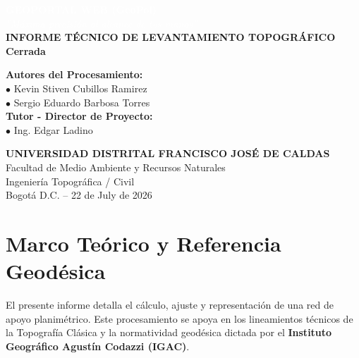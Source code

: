 \documentclass[11pt,letterpaper]{article}
\begin{document}
\begin{titlepage}
\vspace*{-2cm}
\begin{center}
  \textcolor{white}{\Huge \textbf{GEOPORTAL WEB (GeoPol)}} \\[0.5cm]
  \textcolor{white}{\large \textit{''Máxima precisión al alcance de tus manos''}} \\[2cm]
  \vspace{3cm}
  {\LARGE \textbf{INFORME TÉCNICO DE LEVANTAMIENTO TOPOGRÁFICO}} \\[0.5cm]
  {\Large \textbf{Cerrada}} \\[2cm]
  \begin{flushleft}
    \Large \textbf{Autores del Procesamiento:}\\[0.2cm]
    \large $\bullet$ Kevin Stiven Cubillos Ramirez \\[0.1cm]
    \large $\bullet$ Sergio Eduardo Barbosa Torres \\[0.1cm]
    \vspace{1cm}
    \Large \textbf{Tutor - Director de Proyecto:}\\[0.2cm]
    \large $\bullet$ Ing. Edgar Ladino
  \end{flushleft}
  \vfill
  \textbf{UNIVERSIDAD DISTRITAL FRANCISCO JOSÉ DE CALDAS}\\[0.2cm]
  Facultad de Medio Ambiente y Recursos Naturales \\ Ingeniería Topográfica / Civil \\[0.2cm]
  Bogotá D.C. -- 22 de July de 2026
\end{center}
\end{titlepage}
\tableofcontents
\newpage
\section{Marco Teórico y Referencia Geodésica}
El presente informe detalla el cálculo, ajuste y representación de una red de apoyo planimétrico. Este procesamiento se apoya en los lineamientos técnicos de la Topografía Clásica y la normatividad geodésica dictada por el \textbf{Instituto Geográfico Agustín Codazzi (IGAC)}.
\end{document}
